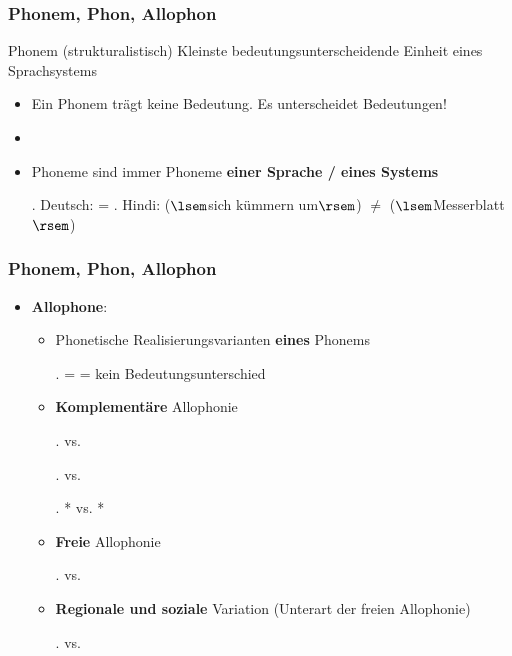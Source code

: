 \begin{frame}
\frametitle{Phonem, Phon, Allophon}

\begin{block}{Phonem (strukturalistisch)}
Kleinste bedeutungsunterscheidende Einheit eines Sprachsystems
\end{block}

\begin{itemize}
	\item Ein Phonem trägt keine Bedeutung. Es unterscheidet Bedeutungen!
	\item[]
	\item Phoneme sind immer Phoneme \textbf{einer Sprache / eines Systems}

	\ex. Deutsch: \textipa{[papa]} = 
	\ex. Hindi: \textipa{[pal]} ($\lsem$sich kümmern um$\rsem$) $\neq$ \textipa{[p\super{h}al]} ($\lsem$Messerblatt$\rsem$) 

\end{itemize}

\end{frame}




\begin{frame}
\frametitle{Phonem, Phon, Allophon}

\begin{itemize}
	\item \textbf{Allophone}:
	
	\begin{itemize}
		\item Phonetische Realisierungsvarianten \textbf{eines} Phonems
		
		\ex. \textipa{[Sp r a:xe]} = \textipa{[Sp \;R a:xe]} = \textipa{[Sp K a:xe]} \ras kein Bedeutungsunterschied

		\item \textbf{Komplementäre} Allophonie

		\ex. \textipa{[x]} vs. \textipa{[\c{c}]}
		
		\ex. \textipa{[bax]} vs. \textipa{[mI\c{c}]}
		
		\ex. *\textipa{[mIx]} vs. *\textipa{[ba\c{c}]}

		\item \textbf{Freie} Allophonie

		\ex. \textipa{[p\super{h}as]} vs. \textipa{[pas]}

		\item \textbf{Regionale und soziale} Variation (Unterart der freien Allophonie)

		\ex. \textipa{[PIS]} vs. \textipa{[PI\c{c}]}

	\end{itemize}
	
\end{itemize}

\end{frame}



